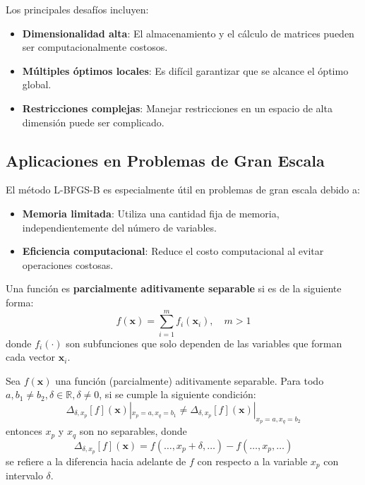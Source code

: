 Los principales desafíos incluyen:

\begin{itemize}
    \item \textbf{Dimensionalidad alta}: El almacenamiento y el cálculo de matrices pueden ser computacionalmente costosos.
    \item \textbf{Múltiples óptimos locales}: Es difícil garantizar que se alcance el óptimo global.
    \item \textbf{Restricciones complejas}: Manejar restricciones en un espacio de alta dimensión puede ser complicado.
\end{itemize}

\subsection{Aplicaciones en Problemas de Gran Escala}

El método L-BFGS-B es especialmente útil en problemas de gran escala debido a:

\begin{itemize}
    \item \textbf{Memoria limitada}: Utiliza una cantidad fija de memoria, independientemente del número de variables.
    \item \textbf{Eficiencia computacional}: Reduce el costo computacional al evitar operaciones costosas.
\end{itemize}

\begin{definicion}
\label{D3}
Una función es \textbf{parcialmente aditivamente separable} si es de la siguiente forma:
\begin{equation}
f(\mathbf{x}) = \sum_{i=1}^{m} f_i(\mathbf{x}_i), \quad m > 1
\label{EQ3}
\end{equation}
donde $f_i(\cdot)$ son subfunciones que solo dependen de las variables que forman cada vector $\mathbf{x}_i$.
\end{definicion}

\begin{teorema}
\label{T1}
Sea $f(\mathbf{x})$ una función (parcialmente) aditivamente separable. Para todo $a, b_1 \neq b_2, \delta \in \mathbb{R}, \delta \neq 0$, si se cumple la siguiente condición:
\begin{equation}
\Delta_{\delta,x_p}[f](\mathbf{x})|_{x_p=a, x_q=b_1} \neq \Delta_{\delta,x_p}[f](\mathbf{x})|_{x_p=a, x_q=b_2}
\label{EQ6}
\end{equation}
entonces $x_p$ y $x_q$ son no separables, donde
\begin{equation}
\Delta_{\delta,x_p}[f](\mathbf{x}) = f(\ldots, x_p + \delta, \ldots) - f(\ldots, x_p, \ldots)
\label{EQ7}
\end{equation}
se refiere a la diferencia hacia adelante de $f$ con respecto a la variable $x_p$ con intervalo $\delta$.
\end{teorema}

